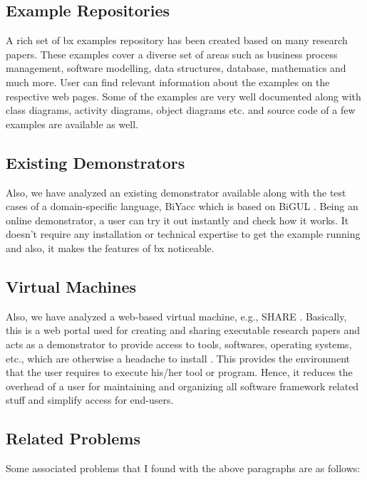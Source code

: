 \subsection{Example Repositories}\label{subsec:examplerep}
A rich set of bx examples repository \cite{bx-examples} has been created based on many research papers. These examples cover a diverse set of areas such as business process management, software modelling, data structures, database, mathematics and much more.
\newline\newline User can find relevant information about the examples on the respective web pages. Some of the examples are very well documented along with class diagrams, activity diagrams, object diagrams etc. and source code of a few examples are available as well.

\subsection{Existing Demonstrators}\label{subsec:existingdemo}
Also, we have analyzed an existing demonstrator available along with the test cases of a domain-specific language, BiYacc \cite{biyacc} which is based on BiGUL \cite{bigul}. 
\newline\newline Being an online demonstrator, a user can try it out instantly and check how it works. It doesn't require any installation or technical expertise to get the example running and also, it makes the features of bx noticeable.
 
\subsection{Virtual Machines}\label{subsec:virtualmachines}
Also, we have analyzed a web-based virtual machine, e.g., SHARE \cite{share}. Basically, this is a web portal used for creating and sharing executable research papers and acts as a demonstrator to provide access to tools, softwares, operating systems, etc., which are otherwise a headache to install \cite{share}. 
\newline\newline This provides the environment that the user requires to execute his/her tool or program. Hence, it reduces the overhead of a user for maintaining and organizing all software framework related stuff and simplify access for end-users.
	
\subsection{Related Problems}\label{subsec:problem}
Some associated problems that I found with the above paragraphs are as follows: 

